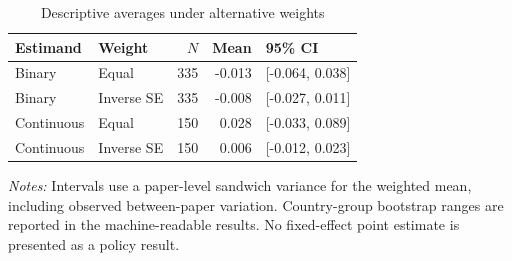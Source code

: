 \begin{table}[htbp]\centering\small
\caption{Descriptive averages under alternative weights}\label{tab:weights}
\setlength{\tabcolsep}{4pt}
\begin{tabular}{llrrl}\toprule
Estimand & Weight & $N$ & Mean & 95\% CI \\
\midrule
Binary & Equal & 335 & -0.013 & [-0.064, 0.038] \\
Binary & Inverse SE & 335 & -0.008 & [-0.027, 0.011] \\
Continuous & Equal & 150 & 0.028 & [-0.033, 0.089] \\
Continuous & Inverse SE & 150 & 0.006 & [-0.012, 0.023] \\
\bottomrule\end{tabular}
\par\vspace{4pt}\begin{minipage}{\textwidth}\footnotesize
\textit{Notes:} Intervals use a paper-level sandwich variance for the weighted mean, including observed between-paper variation. Country-group bootstrap ranges are reported in the machine-readable results. No fixed-effect point estimate is presented as a policy result.
\end{minipage}
\end{table}
